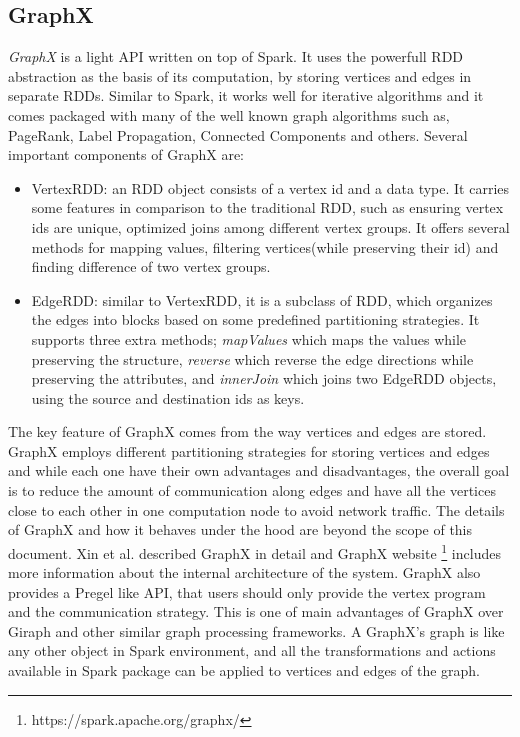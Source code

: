 \documentclass[english]{tktltiki}
\begin{document}
\subsection{GraphX}
\textit{GraphX} is a light API written on top of Spark. It uses the powerfull RDD abstraction as the basis of its computation, by storing vertices and edges in separate RDDs. Similar to Spark, it works well for iterative algorithms and it comes packaged with many of the well known graph algorithms such as, PageRank, Label Propagation, Connected Components and others.  Several important components of GraphX are:
\begin{itemize}
\item VertexRDD: an RDD object consists of a vertex id and a data type. It carries some features in comparison to the traditional RDD, such as ensuring vertex ids are unique, optimized joins among different vertex groups. It offers several methods for mapping values, filtering vertices(while preserving their id) and finding difference of two vertex groups.
\item EdgeRDD: similar to VertexRDD, it is a subclass of RDD, which organizes the edges into blocks based on some predefined partitioning strategies. It supports three extra methods; \textit{mapValues} which maps the values while preserving the structure, \textit{reverse} which reverse the edge directions while preserving the attributes, and \textit{innerJoin} which joins two EdgeRDD objects, using the source and destination ids as keys. 
\end{itemize}
The key feature of GraphX comes from the way vertices and edges are stored. GraphX employs different partitioning strategies for storing vertices and edges and while each one have their own advantages and disadvantages, the overall goal is to reduce the amount of communication along edges and have all the vertices close to each other in one computation node to avoid network traffic. The details of GraphX and how it behaves under the hood are beyond the scope of this document. Xin et al. \cite{xin13} described GraphX in detail and GraphX website  \footnote{https://spark.apache.org/graphx/} includes more information about the internal architecture of the system.
GraphX also provides a Pregel like API, that users should only provide the vertex program and the communication strategy. This is one of main advantages of GraphX over Giraph and other similar graph processing frameworks. A GraphX's graph is like any other object in Spark environment, and all the transformations and actions available in Spark package can be applied to vertices and edges of the graph. 
\end{document}
